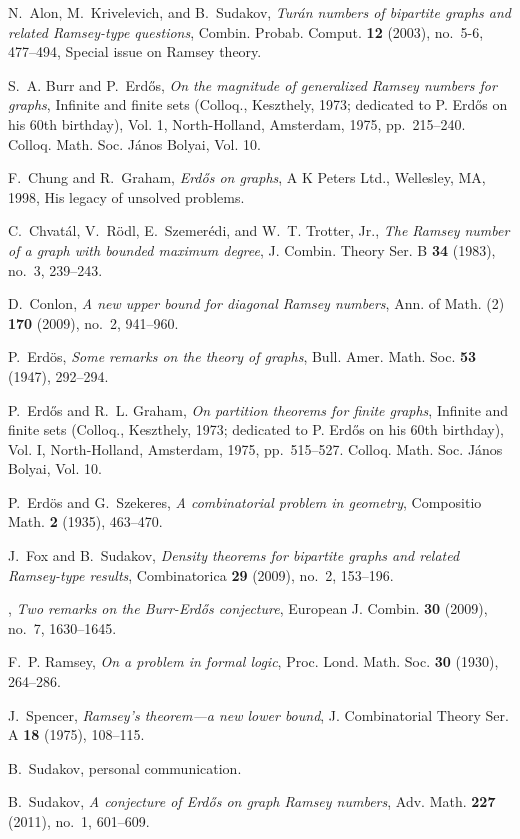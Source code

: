 \documentclass[reqno]{amsart}
\theoremstyle{remark}
\begin{document}
\begin{thebibliography}{10}

N.~Alon, M.~Krivelevich, and B.~Sudakov, \emph{Tur{\'a}n numbers of bipartite
  graphs and related {R}amsey-type questions}, Combin. Probab. Comput.
  \textbf{12} (2003), no.~5-6, 477--494, Special issue on Ramsey theory.

S.~A. Burr and P.~Erd{\H{o}}s, \emph{On the magnitude of generalized {R}amsey
  numbers for graphs}, Infinite and finite sets ({C}olloq., {K}eszthely, 1973;
  dedicated to {P}. {E}rd{\H o}s on his 60th birthday), {V}ol. 1,
  North-Holland, Amsterdam, 1975, pp.~215--240. Colloq. Math. Soc. J\'anos
  Bolyai, Vol. 10.

F.~Chung and R.~Graham, \emph{Erd{\H o}s on graphs}, A K Peters Ltd.,
  Wellesley, MA, 1998, His legacy of unsolved problems.

C.~Chvat{\'a}l, V.~R{\"o}dl, E.~Szemer{\'e}di, and W.~T. Trotter, Jr.,
  \emph{The {R}amsey number of a graph with bounded maximum degree}, J. Combin.
  Theory Ser. B \textbf{34} (1983), no.~3, 239--243.

D.~Conlon, \emph{A new upper bound for diagonal {R}amsey numbers}, Ann. of
  Math. (2) \textbf{170} (2009), no.~2, 941--960.

P.~Erd{\"o}s, \emph{Some remarks on the theory of graphs}, Bull. Amer. Math.
  Soc. \textbf{53} (1947), 292--294.

P.~Erd{\H{o}}s and R.~L. Graham, \emph{On partition theorems for finite
  graphs}, Infinite and finite sets ({C}olloq., {K}eszthely, 1973; dedicated to
  {P}. {E}rd{\H o}s on his 60th birthday), {V}ol. {I}, North-Holland,
  Amsterdam, 1975, pp.~515--527. Colloq. Math. Soc. J\'anos Bolyai, Vol. 10.

P.~Erd{\"o}s and G.~Szekeres, \emph{A combinatorial problem in geometry},
  Compositio Math. \textbf{2} (1935), 463--470.

J.~Fox and B.~Sudakov, \emph{Density theorems for bipartite graphs and related
  {R}amsey-type results}, Combinatorica \textbf{29} (2009), no.~2, 153--196.

\bysame, \emph{Two remarks on the {B}urr-{E}rd{\H o}s conjecture}, European J.
  Combin. \textbf{30} (2009), no.~7, 1630--1645.

F.~P. Ramsey, \emph{On a problem in formal logic}, Proc. Lond. Math. Soc.
  \textbf{30} (1930), 264--286.

J.~Spencer, \emph{Ramsey's theorem---a new lower bound}, J. Combinatorial
  Theory Ser. A \textbf{18} (1975), 108--115.

B.~Sudakov, personal communication.

B.~Sudakov, \emph{A conjecture of {E}rd{\H o}s on graph {R}amsey numbers}, Adv.
  Math. \textbf{227} (2011), no.~1, 601--609.

\end{thebibliography}
\end{document}
